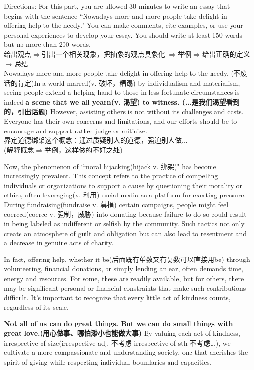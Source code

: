 Directions: For this part, you are allowed 30 minutes to write an essay that begins with the 
sentence ``Nowadays more and more people take delight in offering help to the needy." You 
can make comments, cite examples, or use your personal experiences to develop your essay. 
You should write at least 150 words but no more than 200 words.
~\\


给出观点$\Rightarrow$引出一个相关现象，把抽象的观点具象化
$\Rightarrow$举例$\Rightarrow$给出正确的定义$\Rightarrow$总结
~\\


Nowadays more and more people take delight in offering help to the needy. 
(不废话的肯定)In a world marred(v. 破坏，糟蹋) 
by individualism and materialism, seeing people 
extend a helping hand to those in less fortunate 
circumstances is indeed \textbf{
    a scene  that we all yearn(v. 渴望) to witness. (...是我们渴望看到的，引出话题)
}
However, assisting others is not without its challenges and costs. 
Everyone has their own concerns and limitations, 
and our efforts should be to encourage and support 
rather judge or criticize.
~\\


界定道德绑架这个概念：通过质疑别人的道德，强迫别人做...
~\\

(解释概念$\Rightarrow$举例，这样做的不好之处)


Now, the phenomenon of ``moral hijacking(hijack v. 绑架)" has become 
increasingly prevalent. This concept refers to 
the practice of compelling individuals or 
organizations to support a cause by questioning 
their morality or ethics, often leveraging(v. 利用) 
social media as a platform for exerting pressure. 
During fundraising(fundraise v. 募捐) certain campaigns, people 
might feel coerced(coerce v. 强制，威胁) into donating 
because failure to do so could result in being 
labeled as indifferent or selfish by the community. 
Such tactics not only create an atmosphere of guilt 
and obligation but can also lead to resentment 
and a decrease in genuine acts of charity. 


In fact, offering help, whether it be(后面既有单数又有复数可以直接用be) through 
volunteering, financial donations, or simply 
lending an ear, often demands time, energy 
and resources. For some, these are readily 
available, but for others, there may be significant 
personal or financial constraints that make 
such contributions difficult. It's important 
to recognize that every little act of kindness 
counts, regardless of its scale.


\textbf{Not all of us can do great things. But we can do 
small things with great love.(用心做事、哪怕渺小也能做大事)} 
By valuing each act of kindness, irrespective 
of size(irrespective adj. 不考虑 irrespective of sth 不考虑...), we cultivate a more compassionate and 
understanding society, one that cherishes 
the spirit of giving while respecting individual 
boundaries and capacities.